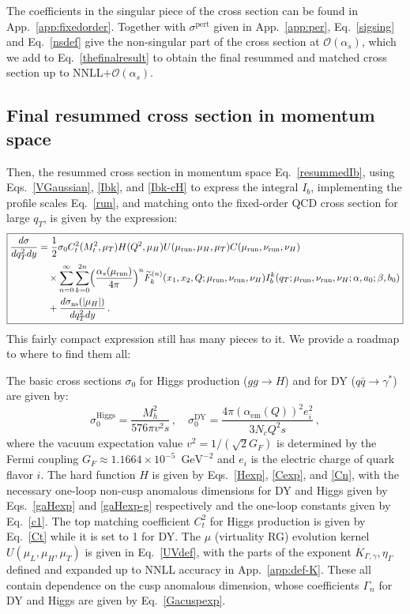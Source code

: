 \documentclass[a4,letterpaper,11pt]{article}
\newcommand{\be}{\begin{equation}}
\newcommand{\ee}{\end{equation}}
\newcommand{\abs}[1]{\left\lvert #1\right\rvert}
\newcommand{\run}{\text{run}}
\newcommand{\mur}{\mu_\run}
\newcommand{\nur}{\nu_\run}
\newcommand{\GeV}{\text{ GeV}}
\newcommand{\as}{\alpha_s}
\newcommand{\cO}{\mathcal{O}}
\newcommand{\wt}{\widetilde}
\newcommand{\eq}[1]{Eq.~\eqref{#1}}
\newcommand{\eqs}[2]{Eqs.~\eqref{#1} and \eqref{#2}}
\newcommand{\eqss}[3]{Eqs.~\eqref{#1}, \eqref{#2}, and \eqref{#3}}
\newcommand{\appx}[1]{App.~\ref{app:#1}}
\begin{document}
The coefficients in the singular piece of the cross section can be found in \appx{fixedorder}.
Together with $\sigma^\text{pert}$ given in \appx{per}, \eq{sigsing} and \eq{nsdef} give the non-singular part of the cross section at $\cO(\as)$, which we add to \eq{thefinalresult} to obtain the final resummed and matched cross section up to NNLL$+\cO(\as)$.

\subsection{Final resummed cross section in momentum space}
\label{ssec:final}

Then, the resummed cross section in momentum space \eq{resummedIb}, using \eqss{VGaussian}{Ibk}{Ibk-cH} to express the integral $I_b$, implementing the profile scales \eq{run}, and matching onto the fixed-order QCD cross section for large $q_T$, is given by the expression:
\be
\label{thefinalfinalresult}
\boxed{
\begin{split}
\frac{d\sigma}{dq_T^2 dy} &= \frac{1}{2}\sigma_0 C_t^2(M_t^2,\mu_T)H(Q^2,\mu_H) U(\mur,\mu_H, \mu_T) C(\mur,\nur,\nu_H) \\
&\quad\times \sum_{n=0}^\infty \sum_{k=0}^{2n} \Bigl(\frac{\as(\mur)}{4\pi}\Bigr)^n \wt F^{(n)}_k(x_1,x_2,Q;\mur,\nur,\nu_H)I_b^k(q_T;\mur,\nur,\nu_H;\alpha,a_0;\beta,b_0) \\
&\quad + \frac{d\sigma_{\text{ns}}(\abs{\mu_H})}{dq_T^2 dy}\,.
\end{split}
}
\ee
This fairly compact expression still has many pieces to it. We provide a roadmap to where to find them all:

The basic cross sections $\sigma_0$ for Higgs production ($gg\to H$) and for DY ($q\bar q\to \gamma^*$)  are given by:
\be
\sigma_0^{\text{Higgs}} =\frac{M_h ^2}{576 \pi v^2 s}\,,\quad \sigma_0^{\text{DY}} =\frac{4 \pi (\alpha_{\text{em}}(Q))^2e_i^2}{3 N_c Q^2 s}\,,
\ee
where the vacuum expectation value $v^2=1/(\sqrt{2} G_F)$ is determined by the Fermi coupling $G_F\approx 1.1664\times 10^{-5}\, \GeV^{-2}$ and $e_i$ is the electric charge of quark flavor $i$.
The hard function $H$ is given by \eqss{Hexp}{Cexp}{Cn}, with the necessary one-loop non-cusp anomalous dimensions for DY and Higgs given by \eqs{gaHexp}{gaHexp-g} respectively and the one-loop constants given by \eq{c1}. The top matching coefficient $C_t^2$ for Higgs production is given by \eq{Ct} while it is set to 1 for DY. 
The $\mu$ (virtuality RG) evolution kernel $U(\mu_L,\mu_H,\mu_T)$ is given in \eq{UVdef}, with the parts of the exponent $K_{\Gamma,\gamma},\eta_\Gamma$ defined and expanded up to NNLL accuracy in \appx{def-K}. These all contain dependence on the cusp anomalous dimension, whose coefficients $\Gamma_n$ for DY and Higgs are given by \eq{Gacuspexp}. 
\end{document}
